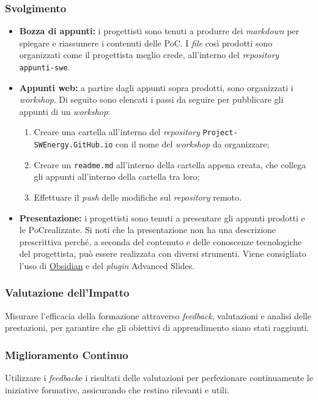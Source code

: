 \subsubsection*{Svolgimento}
\begin{itemize}
	\item \textbf{Bozza di appunti:} i progettisti sono tenuti a produrre dei
		\textit{markdown} per spiegare e riassumere i contenuti delle PoC\g. I
		\textit{file} così prodotti sono organizzati come il progettista
		meglio crede, all'interno del \textit{repository\g}
		\texttt{appunti-swe}.

	\item \textbf{Appunti web:} a partire dagli appunti sopra prodotti, sono
		organizzati i \textit{workshop}. Di seguito sono elencati i passi da
		seguire per pubblicare gli appunti di un \textit{workshop}:
		\begin{enumerate}
			\item Creare una cartella all'interno del \textit{repository\g}
					\texttt{Project-SWEnergy.GitHub.io} con il nome del
					\textit{workshop} da organizzare;

			\item Creare un \texttt{readme.md} all'interno della
					cartella appena creata, che collega gli appunti all'interno
					della cartella tra loro;

			\item Effettuare il \textit{push} delle modifiche sul
					\textit{repository\g} remoto.
		\end{enumerate}

	\item \textbf{Presentazione:} i progettisti sono tenuti a presentare gli
		appunti prodotti e le PoC\g realizzate.
		Si noti che la presentazione non ha una descrizione prescrittiva
		perché, a seconda del contenuto e delle conoscenze tecnologiche del
		progettista, può essere realizzata con diversi strumenti. Viene
		consigliato l'uso di \href{https://obsidian.md/}{Obsidian} e
		del \textit{plugin} Advanced Slides.
\end{itemize}
	  





\subsubsection{Valutazione dell'Impatto} 
Misurare l'efficacia della
	  formazione attraverso \textit{feedback}\g, valutazioni e analisi delle
	  prestazioni, per garantire che gli obiettivi di apprendimento siano
	  stati raggiunti.

\subsubsection{Miglioramento Continuo} 
Utilizzare i \textit{feedback}\g e i
	  risultati delle valutazioni per perfezionare continuamente le
	  iniziative formative, assicurando che restino rilevanti e utili.


